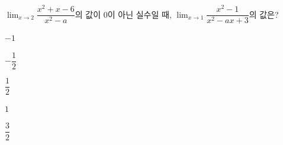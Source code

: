 $\displaystyle\lim_{x\to 2}\dfrac{x^2+x-6}{x^2-a}$의 값이 $0$이 아닌 실수일 때, $\displaystyle\lim_{x\to 1}\dfrac{x^2-1}{x^2-ax+3}$의 값은? 
\begin{choices32}{\rule[-3ex]{0pt}{8ex}$-1$}{\rule[-3ex]{0pt}{8ex}$-\dfrac{1}{2}$}{\rule[-3ex]{0pt}{8ex}$\dfrac{1}{2}$}{\rule[-3ex]{0pt}{8ex}$1$}{\rule[-3ex]{0pt}{8ex}$\dfrac{3}{2}$}\end{choices32}
